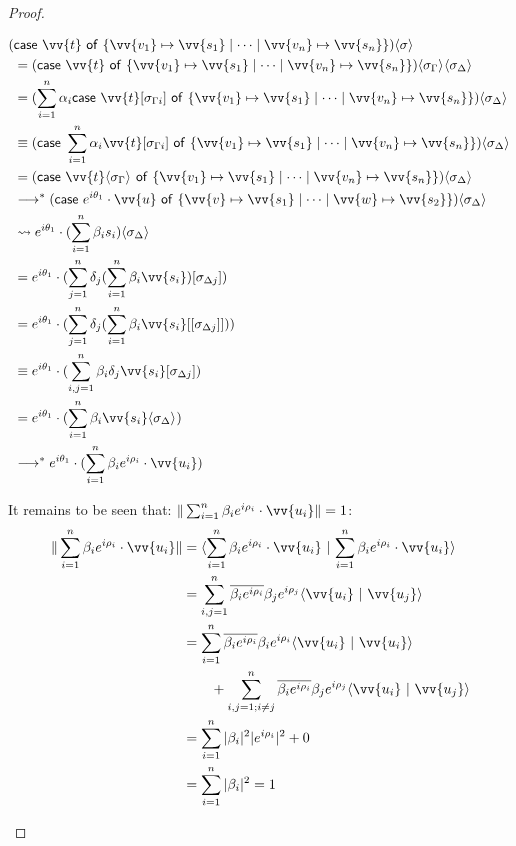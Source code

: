 \documentclass[runningheads,orivec,envcountsame,envcountsect]{llncs}
\newcommand\lra{\longrightarrow}
\newcommand\ansubst[2]{\ensuremath{\langle #1 \rangle_{#2}}}
\def\scal#1#2{\langle{#1}~|~{#2}\rangle}
\def\gencase#1#2#3#4#5{\ensuremath{\mathsf{case}~#1~\mathsf{of}~\{#2\mapsto #4 \mid \dotsb \mid #3\mapsto #5\}}}
\def\lraneq{\rightsquigarrow}
\def\eval{\lra^*}
\begin{document}
\begin{proof}
\begin{description}
    \begin{align*}
        (&\gencase{\vv{t}}{\vv{v_1}}{\vv{v_n}}{\vv{s_1}}{\vv{s_n}})\ansubst{\sigma}{}\\ 
        &= (\gencase{\vv{t}}{\vv{v_1}}{\vv{v_n}}{\vv{s_1}}{\vv{s_n}})\ansubst{\sigma_\Gamma}{}\ansubst{\sigma_\Delta}{}\\
        &=(\sum_{i=1}^{n}\alpha_i \gencase{\vv{t}[\sigma_{\Gamma i}]}{\vv{v_1}}{\vv{v_n}}{\vv{s_1}}{\vv{s_n}})\ansubst{\sigma_\Delta}{} \\
        &\equiv (\gencase{\sum_{i=1}^{n} \alpha_i \vv{t}[\sigma_{\Gamma i}]}{\vv {v_1}}{\vv{v_n}}{\vv{s_1}}{\vv{s_n}})\ansubst{\sigma_\Delta}{}\\
        &=(\gencase{\vv{t}\ansubst{\sigma_\Gamma}{}}{\vv{v_1}}{\vv{v_n}}{\vv{s_1}}{\vv{s_n}})\ansubst{\sigma_\Delta}{}\\
        &\eval(\gencase{e^{i\theta_1}\cdot\vv{u}}{\vv{v}}{\vv{w}}{\vv{s_1}}{\vv{s_2}})\ansubst{\sigma_\Delta}{}\\
        &\lraneq e^{i\theta_1}\cdot(\sum_{i=1}^{n}\beta_i s_i)\ansubst{\sigma_\Delta}{}\\
        &= e^{i\theta_1}\cdot(\sum_{j=1}^{n}\delta_j (\sum_{i=1}^{n}\beta_i \vv{s_i})[\sigma_{\Delta j}])\\
        &= e^{i\theta_1}\cdot(\sum_{j=1}^{n}\delta_j (\sum_{i=1}^{n}\beta_i \vv{s_i}[[\sigma_{\Delta j}]]))\\
        &\equiv e^{i\theta_1}\cdot(\sum_{i,j=1}^{n}\beta_i\delta_j\vv{s_i}[\sigma_{\Delta j}])\\
        &= e^{i\theta_1}\cdot(\sum_{i=1}^{n}\beta_i \vv{s_i}\ansubst{\sigma_\Delta}{})\\
        &\eval e^{i\theta_1}\cdot(\sum_{i=1}^{n}\beta_i e^{i\rho_i}\cdot\vv{u_i})
    \end{align*}
    
    It remains to be seen that: $\|\sum_{i=1}^{n}\beta_i e^{i\rho_i}\cdot\vv{u_i}\|=1$:
    \begin{align*}
        \|\sum_{i=1}^{n}\beta_i e^{i\rho_i}\cdot\vv{u_i}\| &= \scal{\sum_{i=1}^{n}\beta_i e^{i\rho_i}\cdot\vv{u_i}}{\sum_{i=1}^{n}\beta_i e^{i\rho_i}\cdot\vv{u_i}}\\
        &= \sum_{i,j=1}^{n}\overline{\beta_i e^{i\rho_i}}\beta_j e^{i\rho_j} \scal{\vv{u_i}}{\vv{u_j}}\\
        &= \sum_{i=1}^{n}\overline{\beta_i e^{i\rho_i}}\beta_i e^{i\rho_i} \scal{\vv{u_i}}{\vv{u_i}}\\
        &\qquad + \sum_{i,j=1; i\neq j}^{n}\overline{\beta_i e^{i\rho_i}}\beta_j e^{i\rho_j} \scal{\vv{u_i}}{\vv{u_j}}\\
        &= \sum_{i=1}^{n}|\beta_i|^2 |e^{i\rho_i}|^2  + 0\\
        &= \sum_{i=1}^{n}|\beta_i|^2 = 1
    \end{align*}


\end{description}
\end{proof}
\end{document}

